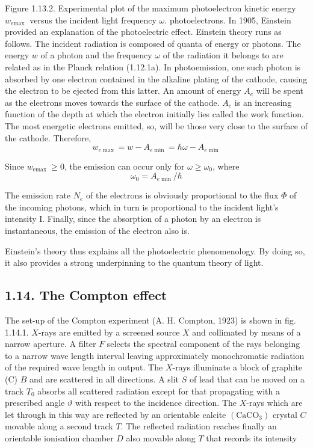 \documentclass{article}
\begin{document}
Figure 1.13.2. Experimental plot of the maximum photoelectron kinetic energy $w_{\text {emax }}$ versus the incident light frequency $\omega$.
photoelectrons.
In 1905, Einstein provided an explanation of the photoelectric effect. Einstein theory runs as follows. The incident radiation is composed of quanta of energy or photons. The energy $w$ of a photon and the frequency $\omega$ of the radiation it belongs to are related as in the Planck relation (1.12.1a). In photoemission, one such photon is absorbed by one electron contained in the alkaline plating of the cathode, causing the electron to be ejected from this latter. An amount of energy $A_{e}$ will be spent as the electrons moves towards the surface of the cathode. $A_{e}$ is an increasing function of the depth at which the electron initially lies called the work function. The most energetic electrons emitted, so, will be those very close to the surface of the cathode. Therefore,
$$
\begin{equation*}
w_{e \max }=w-A_{e \min }=\hbar \omega-A_{e \min } \tag{1.13.3}
\end{equation*}
$$

Since $w_{\text {emax }} \geq 0$, the emission can occur only for $\omega \geq \omega_{0}$, where
$$
\begin{equation*}
\omega_{0}=A_{e \min } / \hbar \tag{1.13.4}
\end{equation*}
$$

The emission rate $N_{e}$ of the electrons is obviously proportional to the flux $\Phi$ of the
incoming photons, which in turn is proportional to the incident light's intensity I. Finally, since the absorption of a photon by an electron is instantaneous, the emission of the electron also is.

Einstein's theory thus explains all the photoelectric phenomenology. By doing so, it also provides a strong underpinning to the quantum theory of light.

\subsection*{1.14. The Compton effect}

The set-up of the Compton experiment (A. H. Compton, 1923) is shown in fig. 1.14.1. $X$-rays are emitted by a screened source $X$ and collimated by means of a narrow aperture. A filter $F$ selects the spectral component of the rays belonging to a narrow wave length interval leaving approximately monochromatic radiation of the required wave length in output. The $X$-rays illuminate a block of graphite (C) $B$ and are scattered in all directions. A slit $S$ of lead that can be moved on a track $T_{0}$ absorbs all scattered radiation except for that propagating with a prescribed angle $\vartheta$ with respect to the incidence direction. The $X$-rays which are let through in this way are reflected by an orientable calcite $\left(\mathrm{CaCO}_{3}\right)$ crystal $C$ movable along a second track $T$. The reflected radiation reaches finally an orientable ionisation chamber $D$ also movable along $T$ that records its intensity
\end{document}

